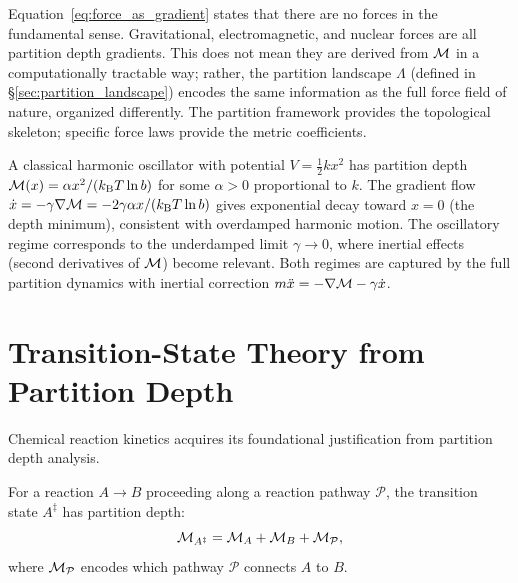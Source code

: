 \begin{remark}
Equation~\eqref{eq:force_as_gradient} states that there are no forces in
the fundamental sense. Gravitational, electromagnetic, and nuclear forces are
all partition depth gradients. This does not mean they are derived from
$\mathcal{M}$ in a computationally tractable way; rather, the partition landscape
$\Lambda$ (defined in \S\ref{sec:partition_landscape}) encodes the same
information as the full force field of nature, organized differently. The
partition framework provides the topological skeleton; specific force laws
provide the metric coefficients.
\end{remark}

\begin{example}
\label{ex:harmonic}
A classical harmonic oscillator with potential $V = \tfrac{1}{2}kx^2$ has
partition depth $\mathcal{M}(x) = \alpha x^2 / (k_{\mathrm{B}} T \ln b)$ for some
$\alpha > 0$ proportional to $k$. The gradient flow
$\dot{x} = -\gamma\nabla\mathcal{M} = -2\gamma\alpha x / (k_{\mathrm{B}} T \ln b)$
gives exponential decay toward $x = 0$ (the depth minimum), consistent with
overdamped harmonic motion. The oscillatory regime corresponds to the
underdamped limit $\gamma \to 0$, where inertial effects (second derivatives
of $\mathcal{M}$) become relevant. Both regimes are captured by the full
partition dynamics with inertial correction $m\ddot{x} = -\nabla\mathcal{M} - \gamma\dot{x}$.
\end{example}

\section{Transition-State Theory from Partition Depth}
\label{sec:transition_state}

Chemical reaction kinetics acquires its foundational justification from
partition depth analysis.

\begin{theorem}
\label{thm:transition_state}
For a reaction $A \to B$ proceeding along a reaction pathway $\mathcal{P}$,
the transition state $A^\ddagger$ has partition depth:
\begin{equation}
  \mathcal{M}_{A^\ddagger} = \mathcal{M}_A + \mathcal{M}_B + \mathcal{M}_{\mathcal{P}},
  \label{eq:transition_depth}
\end{equation}
where $\mathcal{M}_{\mathcal{P}}$ encodes which pathway $\mathcal{P}$ connects
$A$ to $B$.
\end{theorem}

